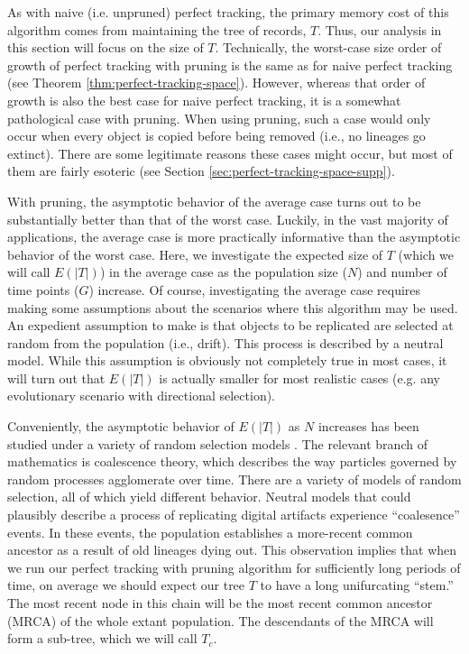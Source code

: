 As with naive (i.e. unpruned) perfect tracking, the primary memory cost of this algorithm comes from maintaining the tree of records, $T$.
Thus, our analysis in this section will focus on the size of $T$.
Technically, the worst-case size order of growth of perfect tracking with pruning is the same as for naive perfect tracking (see Theorem \ref{thm:perfect-tracking-space}).
However, whereas that order of growth is also the best case for naive perfect tracking, it is a somewhat pathological case with pruning.
When using pruning, such a case would only occur when every object is copied before being removed (i.e., no lineages go extinct).
There are some legitimate reasons these cases might occur, but most of them are fairly esoteric (see Section \ref{sec:perfect-tracking-space-supp}).


With pruning, the asymptotic behavior of the average case turns out to be substantially better than that of the worst case. 
Luckily, in the vast majority of applications, the average case is more practically informative than the asymptotic behavior of the worst case.
Here, we investigate the expected size of $T$ (which we will call $E(|T|)$) in the average case as the population size ($N$) and number of time points ($G$) increase.
Of course, investigating the average case requires making some assumptions about the scenarios where this algorithm may be used.
An expedient assumption to make is that objects to be replicated are selected at random from the population (i.e., drift).
This process is described by a neutral model.
While this assumption is obviously not completely true in most cases, it will turn out that $E(|T|)$ is actually smaller for most realistic cases (e.g. any evolutionary scenario with directional selection).

Conveniently, the asymptotic behavior of $E(|T|)$ as $N$ increases has been studied under a variety of random selection models \citep{berestyckiRecentProgressCoalescent2009, tellierCoalescenceMultipleBranching2014, nordborgCoalescentTheory2019}.
The relevant branch of mathematics is coalescence theory, which describes the way particles governed by random processes agglomerate over time.
There are a variety of models of random selection, all of which yield different behavior.
Neutral models that could plausibly describe a process of replicating digital artifacts experience ``coalesence'' events.
In these events, the population establishes a more-recent common ancestor as a result of old lineages dying out.
This observation implies that when we run our perfect tracking with pruning algorithm for sufficiently long periods of time, on average we should expect our tree $T$ to have a long unifurcating ``stem.''
The most recent node in this chain will be the most recent common ancestor (MRCA) of the whole extant population.
The descendants of the MRCA will form a sub-tree, which we will call $T_c$.

